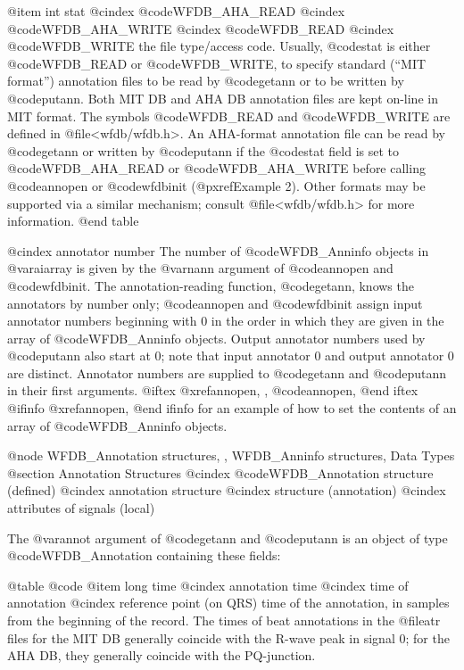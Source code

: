 {{{{{{{{{{@item int stat
@cindex @code{WFDB_AHA_READ}
@cindex @code{WFDB_AHA_WRITE}
@cindex @code{WFDB_READ}
@cindex @code{WFDB_WRITE}
the file type/access code.  Usually, @code{stat} is either @code{WFDB_READ}
or @code{WFDB_WRITE}, to specify standard (``MIT format'') annotation files
to be read by @code{getann} or to be written by @code{putann}.  Both MIT
DB and AHA DB annotation files are kept on-line in MIT format.  The
symbols @code{WFDB_READ} and @code{WFDB_WRITE} are defined in
@file{<wfdb/wfdb.h>}. An AHA-format annotation file can be read by
@code{getann} or written by @code{putann} if the @code{stat} field is
set to @code{WFDB_AHA_READ} or @code{WFDB_AHA_WRITE} before calling
@code{annopen} or @code{wfdbinit} (@pxref{Example 2}).  Other formats
may be supported via a similar mechanism; consult @file{<wfdb/wfdb.h>}
for more information.
@end table

@cindex annotator number
The number of @code{WFDB_Anninfo} objects in @var{aiarray} is given by
the @var{nann} argument of @code{annopen} and @code{wfdbinit}.  The
annotation-reading function, @code{getann}, knows the annotators by
number only; @code{annopen} and @code{wfdbinit} assign input annotator
numbers beginning with 0 in the order in which they are given in the
array of @code{WFDB_Anninfo} objects.  Output annotator numbers used by
@code{putann} also start at 0; note that input annotator 0 and output
annotator 0 are distinct.  Annotator numbers are supplied to
@code{getann} and @code{putann} in their first arguments.
@iftex
@xref{annopen, , @code{annopen}},
@end iftex
@ifinfo
@xref{annopen},
@end ifinfo
for an example of how to set the contents of an array of @code{WFDB_Anninfo}
objects.

@node WFDB_Annotation structures, , WFDB_Anninfo structures, Data Types
@section Annotation Structures
@cindex @code{WFDB_Annotation} structure (defined)
@cindex annotation structure
@cindex structure (annotation)
@cindex attributes of signals (local)

The @var{annot} argument of @code{getann} and @code{putann} is an
object of type @code{WFDB_Annotation} containing these fields:

@table @code
@item long time
@cindex annotation time
@cindex time of annotation
@cindex reference point (on QRS)
time of the annotation, in samples from the beginning of the record.
The times of beat annotations in the @file{atr} files for the MIT DB
generally coincide with the R-wave peak in signal 0; for the AHA DB,
they generally coincide with the PQ-junction.

}}}}}}}}}}
